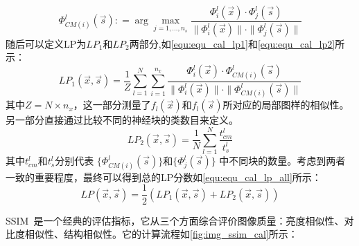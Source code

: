 \begin{equation}
    \label{equ:equ_cal_tmp_phi_cmi}
    \Phi_{CM(i)}^l(\vec{s}){:}=\arg\max_{j=1,...,n_s}\frac{\Phi_i^l(\vec{x})\cdot\Phi_j^l(\vec{s})}{\parallel\Phi_i^l(\vec{x})\parallel\cdot\parallel\Phi_j^l(\vec{s})\parallel}
\end{equation}
随后可以定义LP为$LP_1$和$LP_2$两部分,如\autoref{equ:equ_cal_lp1}和\autoref{equ:equ_cal_lp2}所示：
\begin{equation}
    \label{equ:equ_cal_lp1}
    LP_1(\vec{x},\vec{s})=\frac1Z\sum_{l=1}^N\sum_{i=1}^{n_x}\frac{\Phi_i^l(\vec{x})\cdot\Phi_{CM(i)}^l(\vec{s})}{\parallel\Phi_i^l(\vec{x})\parallel\cdot\parallel\Phi_{CM(i)}^l(\vec{s})\parallel}
\end{equation}
其中\(Z=N\times n_x\)，这一部分测量了\(f_l(\vec{x})\)和\(f_l(\vec{s})\)所对应的局部图样的相似性。
另一部分直接通过比较不同的神经块的类数目来定义。
\begin{equation}
    \label{equ:equ_cal_lp2}
    LP_2(\vec{x},\vec{s})=\frac1N\sum_{l=1}^N\frac{t_{cm}^l}{t_s^l}
\end{equation}
其中$t_{cm}^{l}$和$t_{s}^{l}$分别代表
$\{\Phi_{CM(i)}^l(\vec{s})\}$和$\{\Phi_j^l(\vec{s})\}$
中不同块的数量。考虑到两者一致的重要程度，最终可以得到总的LP分数如\autoref{equ:equ_cal_lp_all}所示：
\begin{equation}
    \label{equ:equ_cal_lp_all}
    LP(\vec{x},\vec{s})=\frac12(LP_1(\vec{x},\vec{s})+LP_2(\vec{x},\vec{s}))
\end{equation}
\par SSIM~\cite{wang2004image}是一个经典的评估指标，它从三个方面综合评价图像质量：亮度相似性、对比度相似性、结构相似性。它的计算流程如\autoref{fig:img_ssim_cal}所示：

